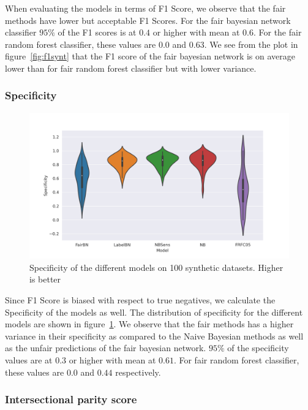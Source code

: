 When evaluating the models in terms of F1 Score, we observe that the fair methods have lower but acceptable F1 Scores. For the fair bayesian network classifier $95\%$ of the F1 scores is at $0.4$ or higher with mean at $0.6$. For the fair random forest classifier, these values are $0.0$ and $0.63$. We see from the plot in figure~\ref{fig:f1synt} that the F1 score of the fair bayesian network is on average lower than for fair random forest classifier but with lower variance.

\subsubsection{Specificity}

\begin{figure}
    \centering
    \includegraphics[width=\linewidth]{figures/Specificity-synthetic.png}
    \caption{Specificity of the different models on 100 synthetic datasets. Higher is better}
    \label{fig:specsynth}
\end{figure}

Since F1 Score is biased with respect to true negatives, we calculate the Specificity of the models as well. The distribution of specificity for the different models are shown in figure~\ref{fig:specsynth}. We observe that the fair methods has a higher variance in their specificity as compared to the Naive Bayesian methods as well as the unfair predictions of the fair bayesian network. $95\%$ of the specificity values are at $0.3$ or higher with mean at $0.61$. For fair random forest classifier, these values are $0.0$ and $0.44$ respectively.

\subsubsection{Intersectional parity score}


